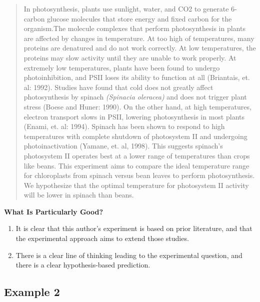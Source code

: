 \documentclass[
]{book}
\providecommand{\tightlist}{%
  \setlength{\itemsep}{0pt}\setlength{\parskip}{0pt}}
\begin{document}
\begin{quote}
In photosynthesis, plants use sunlight, water, and CO2 to generate 6-carbon glucose molecules that store energy and fixed carbon for the organism.The molecule complexes that perform photosynthesis in plants are affected by changes in temperature. At too high of temperatures, many proteins are denatured and do not work correctly. At low temperatures, the proteins may slow activity until they are unable to work properly. At extremely low temperatures, plants have been found to undergo photoinhibition, and PSII loses its ability to function at all (Briantais, et. al: 1992). Studies have found that cold does not greatly affect photosynthesis by spinach \emph{(Spinacia oleracea)} and does not trigger plant stress (Boese and Huner: 1990). On the other hand, at high temperatures, electron transport slows in PSII, lowering photosynthesis in most plants (Enami, et. al: 1994). Spinach has been shown to respond to high temperatures with complete shutdown of photosystem II and undergoing photoinactivation (Yamane, et. al, 1998). This suggests spinach's photosystem II operates best at a lower range of temperatures than crops like beans. This experiment aims to compare the ideal temperature range for chloroplasts from spinach versus bean leaves to perform photosynthesis. We hypothesize that the optimal temperature for photosystem II activity will be lower in spinach than beans.
\end{quote}

\textbf{What Is Particularly Good?}

\begin{enumerate}
\def\labelenumi{\arabic{enumi}.}
\tightlist
\item
  It is clear that this author's experiment is based on prior literature, and that the experimental approach aims to extend those studies.
\item
  There is a clear line of thinking leading to the experimental question, and there is a clear hypothesis-based prediction.
\end{enumerate}

\hypertarget{example-2-3}{%
\subsection{Example 2}\label{example-2-3}}
\end{document}
